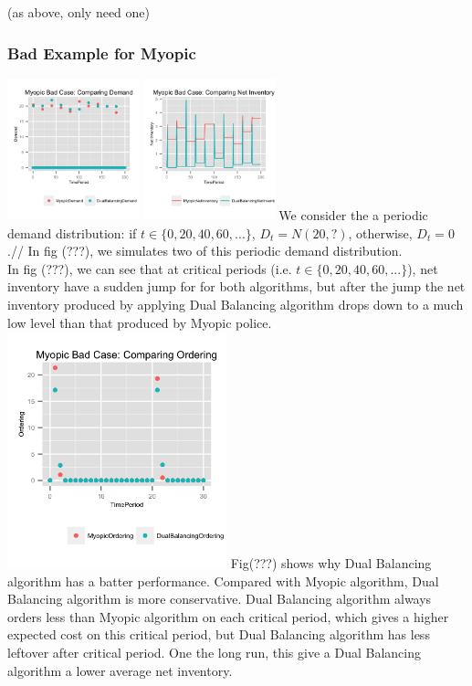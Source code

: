 \documentclass[twoside]{article}
\begin{document}
\begin{multicols}{2}
(as above, only need one)


 \subsubsection{Bad Example for Myopic} 
  \includegraphics[width=1.5in]{figures/MyopicBadDemand.png}
  \includegraphics[width=1.5in]{figures/MyopicBadNetInventory.png}
  We consider the a periodic demand distribution: if $t\in \{0,20,40,60,...\}$, $D_t=N(20,?)$, otherwise, $D_t=0$.//
  In fig (???), we simulates two of this periodic demand distribution.\\
  In fig (???), we can see that at critical periods (i.e. $t\in \{0,20,40,60,...\}$), net inventory have a sudden jump for for both algorithms, but after the jump the net inventory produced by applying Dual Balancing algorithm drops down to a much low level than that produced by Myopic police.
  \includegraphics[width=2.5in]{figures/MyopicBadOrdering.png}
  Fig(???) shows why Dual Balancing algorithm has a batter performance. Compared with Myopic algorithm, Dual Balancing algorithm is more conservative. Dual Balancing algorithm always orders less than Myopic algorithm on each critical period, which gives a higher expected cost on this critical period, but Dual Balancing algorithm has less leftover after critical period. One the long run, this give a Dual Balancing algorithm a lower average net inventory.


\end{multicols}
\end{document}
